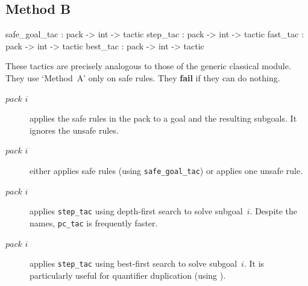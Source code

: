 \subsection{Method B}
\begin{ttbox} 
safe_goal_tac : pack -> int -> tactic
step_tac      : pack -> int -> tactic
fast_tac      : pack -> int -> tactic
best_tac      : pack -> int -> tactic
\end{ttbox}
These tactics are precisely analogous to those of the generic classical
module.  They use `Method~A' only on safe rules.  They {\bf fail} if they
can do nothing.
\begin{description}
\item[ $pack$ $i$] 
applies the safe rules in the pack to a goal and the resulting subgoals.
It ignores the unsafe rules.  

\item[ $pack$ $i$] 
either applies safe rules (using {\tt safe_goal_tac}) or applies one unsafe
rule.

\item[ $pack$ $i$] 
applies {\tt step_tac} using depth-first search to solve subgoal~$i$.
Despite the names, {\tt pc_tac} is frequently faster.

\item[ $pack$ $i$] 
applies {\tt step_tac} using best-first search to solve subgoal~$i$.  It is
particularly useful for quantifier duplication (using ).
\end{description}



